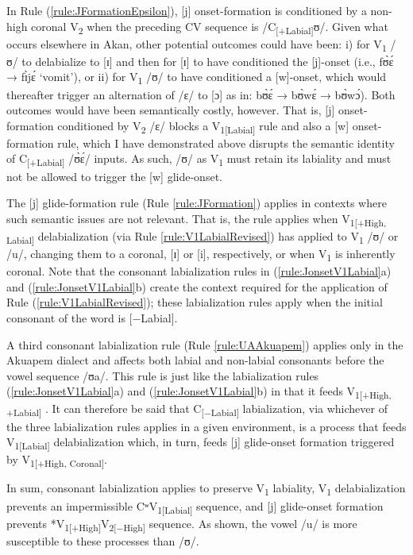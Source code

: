 \documentclass[output=paper,colorlinks,citecolor=brown]{langscibook}
\begin{document}
In Rule (\ref{rule:JFormationEpsilon}), [j] onset-formation is conditioned by a non-high coronal V\textsubscript{2} when the preceding CV sequence is /C\textsubscript{[+Labial]}ʊ/. Given what occurs elsewhere in Akan, other potential outcomes could have been: i) for V\textsubscript{1} /ʊ/ to delabialize to [ɪ] and then for [ɪ] to have conditioned the [j]-onset (i.e., fʊ̀ɛ́ →  fɪ̀jɛ́ ‘vomit’), or ii) for V\textsubscript{1} /ʊ/ to have conditioned a [w]-onset, which would thereafter trigger an alternation of /ɛ/ to [ɔ] as in: bʊ̀ɛ́ → bʊ̀wɛ́ → bʊ̀wɔ́). Both outcomes would have been semantically costly, however. That is, [j] onset-formation conditioned by V\textsubscript{2} /ɛ/ blocks a V\textsubscript{1[Labial]}  rule and also a [w] onset-formation rule, which I have demonstrated above disrupts the  semantic identity of C\textsubscript{[+Labial]} /ʊ̀ɛ́/ inputs. As such, /ʊ/ as V\textsubscript{1} must retain its  labiality and must not be allowed to trigger the [w] glide-onset. 

The [j] glide-formation rule (Rule \ref{rule:JFormation}) applies in contexts where such semantic issues are not relevant. That is, the rule applies when V\textsubscript{1[+High, Labial]} delabialization (via Rule \ref{rule:V1LabialRevised}) has applied to V\textsubscript{1} /ʊ/ or /u/, changing them to a coronal, [ɪ] or [i], respectively, or when V\textsubscript{1} is inherently coronal. Note that the consonant labialization rules in (\ref{rule:JonsetV1Labial}a) and (\ref{rule:JonsetV1Labial}b) create the context required for the application of Rule (\ref{rule:V1LabialRevised}); these labialization rules apply when the initial consonant of the word is [−Labial]. 

A third consonant labialization rule (Rule \ref{rule:UAAkuapem}) applies only in the Akuapem dialect and affects both labial and non-labial consonants before the vowel sequence /ʊa/. This rule is just like the labialization rules (\ref{rule:JonsetV1Labial}a) and (\ref{rule:JonsetV1Labial}b) in that it feeds V\textsubscript{1[+High, +Labial]} . It can therefore be said that C\textsubscript{[−Labial]} labialization, via whichever of the three labialization rules applies in a given environment, is a process that  feeds V\textsubscript{1[Labial]} delabialization which, in turn,  feeds [j] glide-onset formation triggered by V\textsubscript{1[+High, Coronal]}. 

In sum, consonant labialization applies to preserve V\textsubscript{1} labiality,  V\textsubscript{1} delabialization prevents an impermissible CʷV\textsubscript{1[Labial]} sequence, and [j] glide-onset formation prevents *V\textsubscript{1[+High]}V\textsubscript{2[−High]} sequence. As shown, the vowel /u/ is more susceptible to these processes than /ʊ/.  
\end{document}
